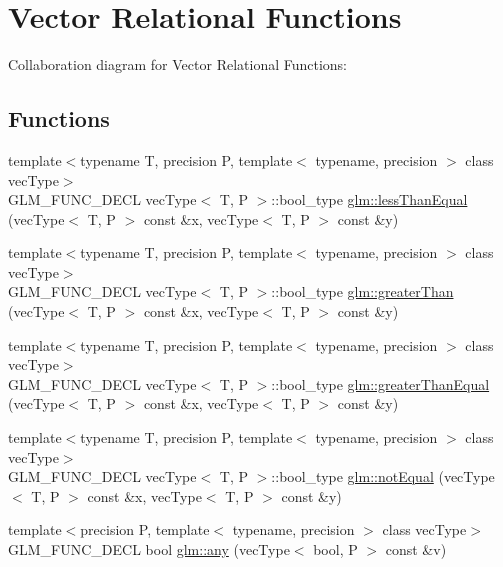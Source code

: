 \hypertarget{group__core__func__vector__relational}{
\section{Vector Relational Functions}
\label{group__core__func__vector__relational}
}


Collaboration diagram for Vector Relational Functions:\subsection*{Functions}
\begin{CompactItemize}
\item 
{\footnotesize template$<$typename T, precision P, template$<$ typename, precision $>$ class vecType$>$ }\\GLM\_\-FUNC\_\-DECL vecType$<$ T, P $>$::bool\_\-type \hyperlink{group__core__func__vector__relational_g9792ee46fa6f48a7f750984128c24d03}{glm::lessThanEqual} (vecType$<$ T, P $>$ const \&x, vecType$<$ T, P $>$ const \&y)
\item 
{\footnotesize template$<$typename T, precision P, template$<$ typename, precision $>$ class vecType$>$ }\\GLM\_\-FUNC\_\-DECL vecType$<$ T, P $>$::bool\_\-type \hyperlink{group__core__func__vector__relational_g752f4c03f55a280172de9ceff7a02b51}{glm::greaterThan} (vecType$<$ T, P $>$ const \&x, vecType$<$ T, P $>$ const \&y)
\item 
{\footnotesize template$<$typename T, precision P, template$<$ typename, precision $>$ class vecType$>$ }\\GLM\_\-FUNC\_\-DECL vecType$<$ T, P $>$::bool\_\-type \hyperlink{group__core__func__vector__relational_ga384b9c124d40d56bf5bd02ea9b04926}{glm::greaterThanEqual} (vecType$<$ T, P $>$ const \&x, vecType$<$ T, P $>$ const \&y)
\item 
{\footnotesize template$<$typename T, precision P, template$<$ typename, precision $>$ class vecType$>$ }\\GLM\_\-FUNC\_\-DECL vecType$<$ T, P $>$::bool\_\-type \hyperlink{group__core__func__vector__relational_g520b77f15b84fffa9131cfa39db6c766}{glm::notEqual} (vecType$<$ T, P $>$ const \&x, vecType$<$ T, P $>$ const \&y)
\item 
{\footnotesize template$<$precision P, template$<$ typename, precision $>$ class vecType$>$ }\\GLM\_\-FUNC\_\-DECL bool \hyperlink{group__core__func__vector__relational_ge1073be2b9f4c5ffa77eec25400e8121}{glm::any} (vecType$<$ bool, P $>$ const \&v)

\end{CompactItemize}
